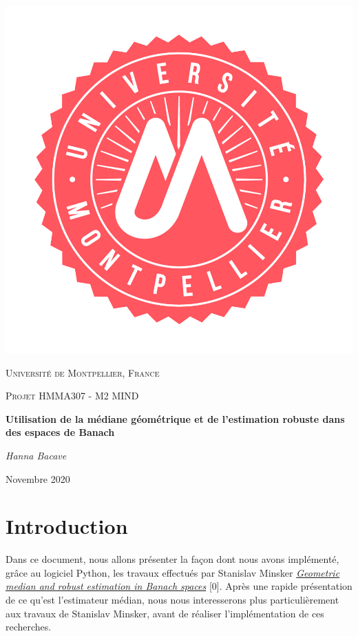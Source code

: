 \documentclass{article}
\begin{document}
\thispagestyle{empty}
\setlength\headheight{0pt} 
\begin{center}
\begin{center}
\includegraphics[width=0.45\linewidth]{montpellier.png}     
\end{center}	

        \vspace{0.40cm}
        {\scshape\LARGE Université de Montpellier, France\par}
        \vspace{0.50cm}
        {\scshape\Large Projet HMMA307 - M2 MIND \par}
        \vspace{0.90cm}

        {\Large\bfseries Utilisation de la médiane géométrique  et de l'estimation robuste dans des espaces de Banach\par}
        
        \vspace{1cm}
        {\Large\itshape Hanna Bacave\par}
        \vspace{0.70cm}


\begin{center}
    Novembre 2020
\end{center}

\end{center}

\newpage

\renewcommand{\contentsname}{Table des matières} 
\tableofcontents
\pagebreak
{}


\section*{Introduction}
Dans ce document, nous allons présenter la façon dont nous avons implémenté, grâce au logiciel Python, les travaux effectués par Stanislav Minsker \textit{\href{https://arxiv.org/pdf/1308.1334.pdf}{Geometric median and robust estimation in Banach spaces}} [0]. Après une rapide présentation de ce qu'est l'estimateur médian, nous nous interesserons plus particulièrement aux travaux de Stanislav Minsker, avant de réaliser l'implémentation de ces recherches.
\end{document}
